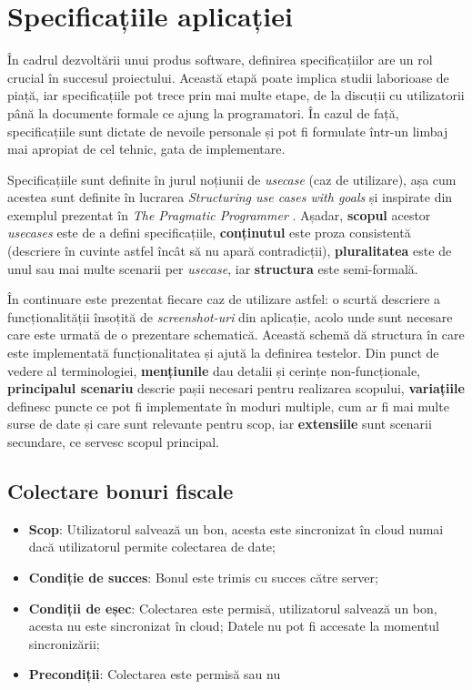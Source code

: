 \chapter{Specificațiile aplicației}\label{specs}

În cadrul dezvoltării unui produs software, definirea specificațiilor are un rol crucial în succesul proiectului. Această etapă poate implica studii laborioase de piață, iar specificațiile pot trece prin mai multe etape, de la discuții cu utilizatorii până la documente formale ce ajung la programatori. În cazul de față, specificațiile sunt dictate de nevoile personale și pot fi formulate într-un limbaj mai apropiat de cel tehnic, gata de implementare.

Specificațiile sunt definite în jurul noțiunii de \emph{usecase} (caz de utilizare), așa cum acestea sunt definite în lucrarea \emph{Structuring use cases with goals} \cite{cockburn1997structuring} și inspirate din exemplul prezentat în \emph{The Pragmatic Programmer} \cite{Hunt:2000:PPJ:320326}. Așadar, \textbf{scopul} acestor \emph{usecases} este de a defini specificațiile, \textbf{conținutul} este proza consistentă (descriere în cuvinte astfel încât să nu apară contradicții), \textbf{pluralitatea} este de unul sau mai multe scenarii per \emph{usecase}, iar \textbf{structura} este semi-formală.

În continuare este prezentat fiecare caz de utilizare astfel: o scurtă descriere a funcționalității însoțită de \emph{screenshot-uri} din aplicație, acolo unde sunt necesare care este urmată de o prezentare schematică. Această schemă dă structura în care este implementată funcționalitatea și ajută la definirea testelor. Din punct de vedere al terminologiei, \textbf{mențiunile} dau detalii și cerințe non-funcționale, \textbf{principalul scenariu} descrie pașii necesari pentru realizarea scopului, \textbf{variațiile} definesc puncte ce pot fi implementate în moduri multiple, cum ar fi mai multe surse de date și care sunt relevante pentru scop, iar \textbf{extensiile} sunt scenarii secundare, ce servesc scopul principal.





\section{Colectare bonuri fiscale}\label{spec:collecting}

\begin{itemize}
\item
  \textbf{Scop}: Utilizatorul salvează un bon, acesta este sincronizat în cloud numai dacă utilizatorul permite colectarea de date;
\item
  \textbf{Condiție de succes}: Bonul este trimis cu succes către server;
\item
  \textbf{Condiții de eșec}: Colectarea este permisă, utilizatorul salvează un bon, acesta nu este sincronizat în cloud; Datele nu pot fi accesate la momentul sincronizării;
\item
  \textbf{Precondiții}: Colectarea este permisă sau nu
\end{itemize}

